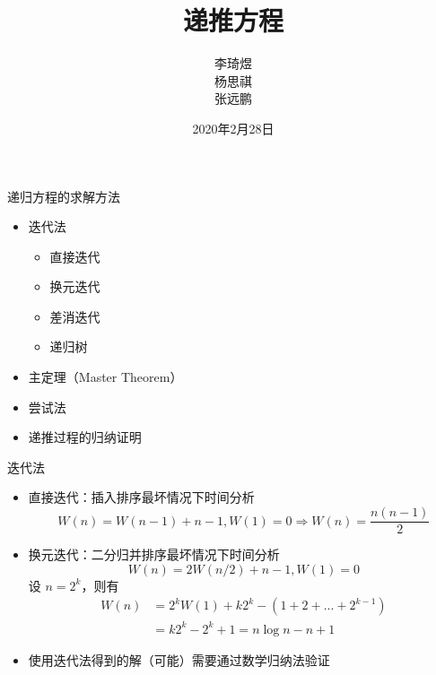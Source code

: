\documentclass{ctexbeamer}
\title{递推方程}
\author{李琦煜 \\ 杨思祺 \\ 张远鹏}
\institute{算法设计与分析2020小班17}
\date{2020年2月28日}
\begin{document}
    \begin{frame}
        \maketitle
    \end{frame}

    \begin{frame}{递归方程的求解方法}
        \begin{itemize}
            \setlength{\itemsep}{1em}
            \item 迭代法
            \begin{itemize}
                \setlength{\itemsep}{0.3em}
                \item 直接迭代
                \item 换元迭代
                \item 差消迭代
                \item 递归树
            \end{itemize}
            \item 主定理（Master Theorem）
            \item 尝试法
            \item 递推过程的归纳证明
        \end{itemize}
    \end{frame}

    
    \begin{frame}{迭代法}
            \begin{itemize}
                \item<1-> 直接迭代：插入排序最坏情况下时间分析
                $$W(n)=W(n-1)+n-1,W(1)=0\Rightarrow W(n)=\frac{n(n-1)}{2}$$
                \item<2-> 换元迭代：二分归并排序最坏情况下时间分析
                $$W(n)=2W(n/2)+n-1,W(1)=0$$
                设 $n=2^k$，则有
                \begin{align*} W(n) &=
2^kW(1)+k2^k-(1+2+...+2^{k-1})\\&=k2^k-2^k+1=n\log n-n+1\end{align*}
                \item<3->  使用迭代法得到的解（可能）需要通过数学归纳法验证
            \end{itemize}
    \end{frame}
\end{document}
